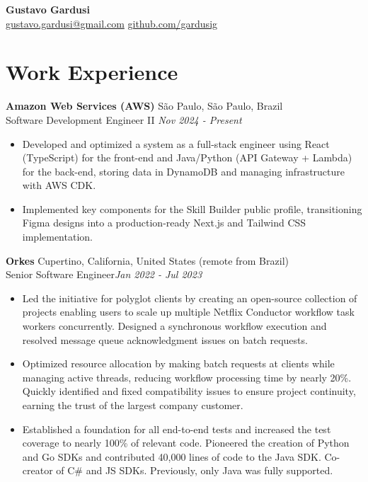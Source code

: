 \documentclass[a4paper,10pt]{article}
\begin{document}
\begin{center}
    {\LARGE \textbf{Gustavo Gardusi}}\\
    \vspace{0.5em}
    \href{mailto:gustavo.gardusi@gmail.com}{gustavo.gardusi@gmail.com} \hspace{1cm} 
    \href{https://github.com/gardusig}{github.com/gardusig}
\end{center}


\section*{Work Experience}

\textbf{Amazon Web Services (AWS)} \hfill São Paulo, São Paulo, Brazil \\
Software Development Engineer II \hfill \textit{Nov 2024 - Present}
\begin{itemize}
    \item Developed and optimized a system as a full-stack engineer using React (TypeScript) for the front-end and Java/Python (API Gateway + Lambda) for the back-end, storing data in DynamoDB and managing infrastructure with AWS CDK.
    \item Implemented key components for the Skill Builder public profile, transitioning Figma designs into a production-ready Next.js and Tailwind CSS implementation.
\end{itemize}

\textbf{Orkes} \hfill Cupertino, California, United States (remote from Brazil) \\
Senior Software Engineer\hfill \textit{Jan 2022 - Jul 2023}
\begin{itemize}
    \item Led the initiative for polyglot clients by creating an open-source collection of projects enabling users to scale up multiple Netflix Conductor workflow task workers concurrently. Designed a synchronous workflow execution and resolved message queue acknowledgment issues on batch requests.
    \item Optimized resource allocation by making batch requests at clients while managing active threads, reducing workflow processing time by nearly 20\%. Quickly identified and fixed compatibility issues to ensure project continuity, earning the trust of the largest company customer.
    \item Established a foundation for all end-to-end tests and increased the test coverage to nearly 100\% of relevant code. Pioneered the creation of Python and Go SDKs and contributed 40,000 lines of code to the Java SDK. Co-creator of C\# and JS SDKs. Previously, only Java was fully supported.
\end{itemize}
\end{document}
